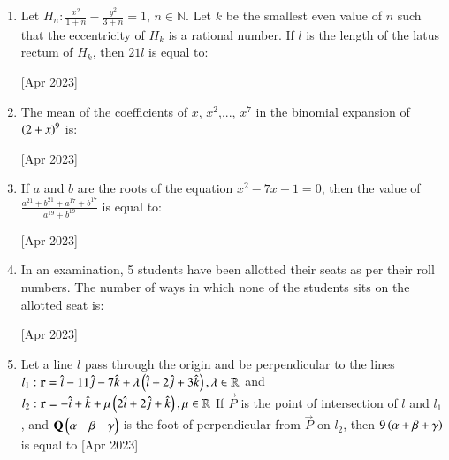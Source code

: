 \documentclass[journal]{IEEEtran}
\begin{document}
\begin{enumerate}
	\hfill [Apr 2023]
	
	\item 
	Let $H_n:\frac{x^2}{1+n} - \frac{y^2}{3+n} = 1$, $n \in \mathbb{N}$. Let $k$ be the smallest even value of $n$ such that the eccentricity of $H_k$ is a rational number. If $l$ is the length of the latus rectum of $H_k$, then $21l$ is equal to:
	
	\hfill [Apr 2023]
	
	\item
	The mean of the coefficients of $x$, $x^2$,..., $x^7$ in the binomial expansion of $\left(2 + x\right)^{9}$ is:
	
	\hfill [Apr 2023]
	
	\item
	If $a$ and $b$ are the roots of the equation $x^{2} - 7x - 1 = 0$, then the value of $\frac{a^{21} + b^{21} + a^{17} + b^{17}}{a^{19} + b^{19}}$ is equal to:
	
	\hfill [Apr 2023]
	
	\item
	In an examination, 5 students have been allotted their seats as per their roll numbers. The number of ways in which none of the students sits on the allotted seat is:
	
	\hfill [Apr 2023]
	
	\item
Let a line $l$ pass through the origin and be perpendicular to the lines \\
	$l_1 : \mathbf{r} = \hat{i} - 11\hat{j} - 7\hat{k} + \lambda\left(\hat{i} +2\hat{j} + 3\hat{k}\right), \lambda \in \mathbb{R}$ and \\
	$l_2 : \mathbf{r} = -\hat{i} + \hat{k} + \mu\left(2\hat{i} +2\hat{j} + \hat{k}\right), \mu \in \mathbb{R}$
	If $\vec{P}$ is the point of intersection of $l$ and $l_1$, and $\mathbf{Q} \begin{pmatrix}\alpha & \beta & \gamma\end{pmatrix}$ is the foot of perpendicular from $\vec{P}$ on $l_2$, then $9\left(\alpha+\beta+\gamma\right)$ is equal to
	\hfill [Apr 2023]
 \end{enumerate}
 
\end{document}
